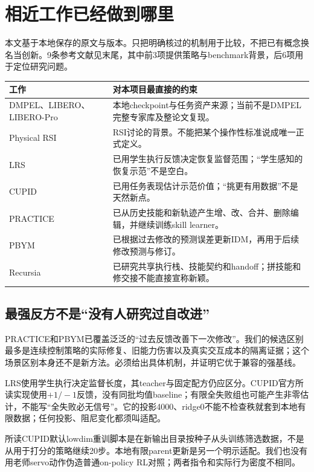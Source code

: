 \documentclass[UTF8,a4paper,fontset=none,zihao=-4]{ctexart}
\begin{document}
\section{相近工作已经做到哪里}
本文基于本地保存的原文与版本。只把明确核过的机制用于比较，不把已有概念换名当创新。9条参考文献见末尾，其中前3项提供策略与benchmark背景，后6项用于定位研究问题。
\par
\begin{table}[htbp]\centering\small
\noindent\begin{tabularx}{\textwidth}{p{30mm}Y}\toprule
工作 & 对本项目最直接的约束\\\midrule
DMPEL、LIBERO、LIBERO-Pro\citep{dmpel,libero,liberopro} & 本地checkpoint与任务资产来源；当前不是DMPEL完整专家库及整论文复现。\\
Physical RSI\citep{physical_rsi} & RSI讨论的背景。不能把某个操作性标准说成唯一正式定义。\\
LRS\citep{local_recovery} & 已用学生执行反馈决定恢复监督范围；“学生感知的恢复示范”不是空白。\\
CUPID\citep{cupid} & 已用任务表现估计示范价值；“挑更有用数据”不是天然新点。\\
PRACTICE\citep{practice} & 已从历史技能和新轨迹产生增、改、合并、删除编辑，并继续训练skill learner。\\
PBYM\citep{predict_before_modify} & 已根据过去修改的预测误差更新IDM，再用于后续修改预测与修订。\\
Recursia\citep{recursia} & 已研究共享执行栈、技能契约和handoff；拼技能和修交接不能直接宣称新颖。\\\bottomrule
\end{tabularx}
\end{table}
\par
\subsection{最强反方不是“没有人研究过自改进”}
PRACTICE和PBYM已覆盖泛泛的“过去反馈改善下一次修改”。我们的候选区别最多是连续控制策略的实际修复、旧能力伤害以及真实交互成本的隔离证据；这个场景区别本身还不是新方法。必须给出具体机制，并证明它优于兼容的强基线。

LRS使用学生执行决定监督长度，其teacher与固定配方仍应区分。CUPID官方所读实现使用$+1/-1$反馈，没有同批均值baseline；有限全失败组也可能产生非零估计，不能写“全失败必无信号”。它的投影4000、ridge0不能不检查秩就套到本地有限数据；任何投影、阻尼变化都须叫适配。

所读CUPID默认lowdim重训脚本是在新输出目录按种子从头训练筛选数据，不是从用于打分的策略继续20步。本地有限parent更新是另一个明示适配。我们也没有用老师servo动作伪造普通on-policy RL对照；两者指令和实际行为密度不相同。
\end{document}
